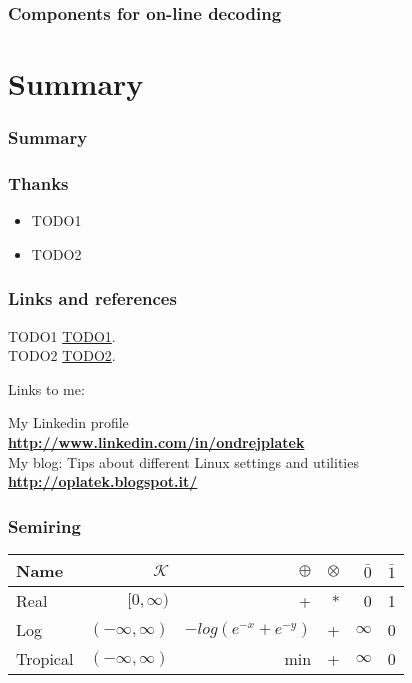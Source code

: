 \begin{frame}\frametitle{Components for on-line decoding} 
        
\end{frame}

\section{Summary} 

\begin{frame} \frametitle{Summary} \tableofcontents \end{frame}

\begin{frame}\frametitle{Thanks} 
    \begin{itemize}
        \item TODO1 
        \item TODO2 
    \end{itemize}
\end{frame}

\begin{frame}\frametitle{Links and references} 
\begin{center}
TODO1 \url{TODO1}.\\
TODO2 \url{TODO2}.
\end{center}

\begin{alertblock}{Links to me:}
\begin{center}
My Linkedin profile\\
{\bf \url{http://www.linkedin.com/in/ondrejplatek}}\\
My blog: Tips about different Linux settings and utilities\\
{\bf \url{http://oplatek.blogspot.it/}}\\
\end{center}
\end{alertblock}
\end{frame}

\begin{frame} \frametitle{Semiring}
\begin{tabular}{lrrrrr}
\hline
Name & $\mathcal{K}$ & $\oplus$ & $ \otimes$ & $\bar{0}$ & $\bar{1}$ \\ 
\hline
Real        & $[0,\infty)$        &  +                     &  * &  0        &  1  \\
Log         & $(-\infty, \infty)$ & $-log(e^{-x} + e^{-y})$ & + &  $\infty$ &  0  \\
Tropical    & $(-\infty, \infty)$ &  min                   &  + &  $\infty$ &  0  \\
\hline
\end{tabular}
\end{frame}

